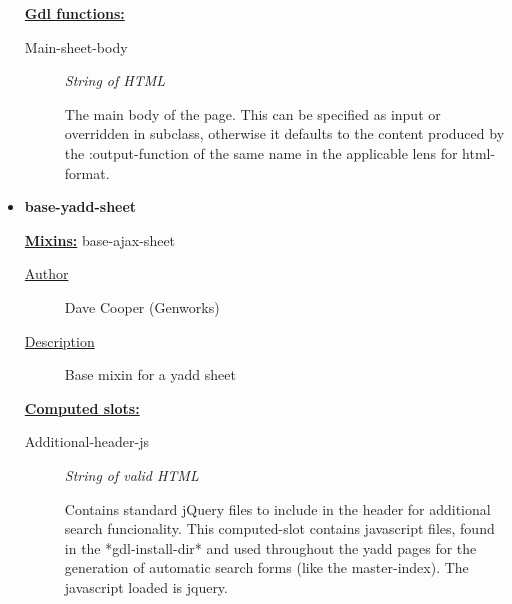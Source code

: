 \documentclass [11pt]{book}
\begin{document}
\begin{itemize}
\begin{description}
\end{description}






\textbf{
\underline{Gdl functions:}}

\begin{description}

\item [Main-sheet-body]
\emph{String of HTML}

 The main body of the page.
This can be specified as input or overridden in subclass, otherwise it defaults
to the content produced by the :output-function of the same name
in the applicable lens for  html-format.




\end{description}







\item {}
\label{prim:base-yadd-sheet}
\textbf{base-yadd-sheet}


\textbf{
\underline{Mixins:}} base-ajax-sheet





\begin{description}

\item [
\underline{Author}]


Dave Cooper (Genworks)



\item [
\underline{Description}]


Base mixin for a yadd sheet



\end{description}








\textbf{
\underline{Computed slots:}}

\begin{description}

\item [Additional-header-js]
\emph{String of valid HTML}

 Contains standard jQuery files to include
in the header for additional search funcionality.  This computed-slot
contains javascript files, found in the *gdl-install-dir* and used
throughout the yadd pages for the generation of automatic search
forms (like the master-index).  The javascript loaded is jquery.





\end{description}
\end{itemize}
\end{document}

